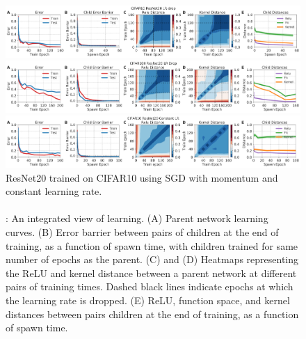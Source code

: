 \documentclass{article}
\begin{document}
%

\begin{figure}[h]
    \centering
    \includegraphics[width=\linewidth]{figures/cifar10-resnet20-lr-drop-camera.pdf}
    \caption{SOTA ResNet20 trained on CIFAR10 using SGD with momentum and learning rate drops. 
    }
    \label{fig:megaplot1}
%
%
    \centering
    \includegraphics[width=\linewidth]{figures/cifar100-resnet20-lr-drop-camera.pdf}
    \caption{ResNet20 trained on CIFAR100 using SGD with momentum and learning rate drops. 
    }
    \label{fig:megaplot2}
%
    \centering
    \includegraphics[width=\linewidth]{figures/cifar10-resnet20-constant-lr-camera.pdf}
    \caption{ResNet20 trained on CIFAR10 using SGD with momentum and constant learning rate.
    \ \\ \ \\
    : An integrated view of learning. 
    (A) Parent network learning curves. 
    (B) Error barrier between pairs of children at the end of training, as a function of spawn time, with children trained for same number of epochs as the parent. 
    (C) and (D) Heatmaps representing the ReLU and kernel distance between a parent network at different pairs of training times. Dashed black lines indicate epochs at which the learning rate is dropped. (E) ReLU, function space, and kernel distances between pairs children at the end of training, as a function of spawn time. }
    \label{fig:megaplot0}
\end{figure}

\vspace{-0.3cm}
\end{document}
